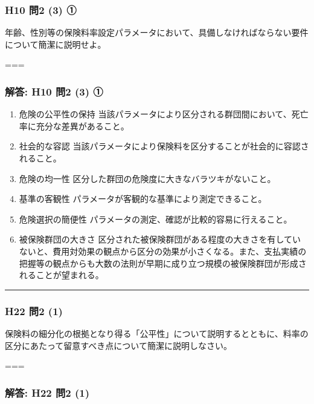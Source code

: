 \documentclass[
]{article}
\providecommand{\tightlist}{%
  \setlength{\itemsep}{0pt}\setlength{\parskip}{0pt}}
\begin{document}
\hypertarget{h10-ux554f2-3-ux2460}{%
\subsubsection{H10 問2 (3) ①}\label{h10-ux554f2-3-ux2460}}

年齢、性別等の保険料率設定パラメータにおいて、具備しなければならない要件について簡潔に説明せよ。

===

\hypertarget{ux89e3ux7b54-h10-ux554f2-3-ux2460}{%
\subsubsection{解答: H10 問2 (3)
①}\label{ux89e3ux7b54-h10-ux554f2-3-ux2460}}

\begin{enumerate}
\def\labelenumi{\arabic{enumi}.}
\tightlist
\item
  危険の公平性の保持
  当該パラメータにより区分される群団間において、死亡率に充分な差異があること。
\item
  社会的な容認
  当該パラメータにより保険料を区分することが社会的に容認されること。
\item
  危険の均一性 区分した群団の危険度に大きなバラツキがないこと。
\item
  基準の客観性 パラメータが客観的な基準により測定できること。
\item
  危険選択の簡便性 パラメータの測定、確認が比較的容易に行えること。
\item
  被保険群団の大きさ
  区分された被保険群団がある程度の大きさを有していないと、費用対効果の観点から区分の効果が小さくなる。また、支払実績の把握等の観点からも大数の法則が早期に成り立つ規模の被保険群団が形成されることが望まれる。
\end{enumerate}

\begin{center}\rule{0.5\linewidth}{0.5pt}\end{center}

\hypertarget{h22-ux554f2-1}{%
\subsubsection{H22 問2 (1)}\label{h22-ux554f2-1}}

保険料の細分化の根拠となり得る「公平性」について説明するとともに、料率の区分にあたって留意すべき点について簡潔に説明しなさい。

===

\hypertarget{ux89e3ux7b54-h22-ux554f2-1}{%
\subsubsection{解答: H22 問2 (1)}\label{ux89e3ux7b54-h22-ux554f2-1}}
\end{document}
